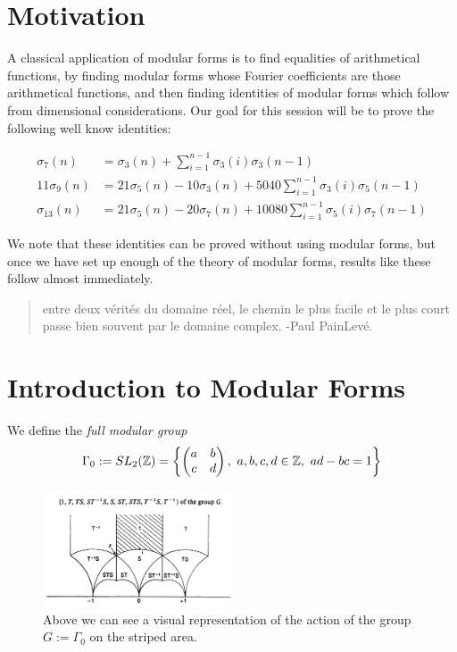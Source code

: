 \section*{Motivation}
A classical application of modular forms is to find equalities of arithmetical functions,
by finding modular forms whose Fourier coefficients are those arithmetical functions, and then
finding identities of modular forms which follow from dimensional considerations. Our goal for
this session will be to prove the following well know identities:

\begin{align*}
    \sigma_7(n) &= \sigma_3(n)+\sum_{i=1}^{n-1}\sigma_3(i)\sigma_3(n-1) \\
    11\sigma_9(n) &= 21\sigma_5(n)-10\sigma_3(n)+5040\sum_{i=1}^{n-1}\sigma_3(i)\sigma_5(n-1) \\
    \sigma_{13}(n) &= 21\sigma_5(n)-20\sigma_7(n)+10080\sum_{i=1}^{n-1}\sigma_5(i)\sigma_7(n-1)     
\end{align*}

We note that these identities can be proved without using modular forms, but once we  have 
set up enough of the theory of modular forms, results like these follow almost immediately. 

\begin{quotation}
    entre deux vérités du domaine réel, le chemin le plus facile et le plus court passe bien souvent par le domaine complex. 
    \mb 
    -Paul PainLevé.
\end{quotation}

\section{Introduction to Modular Forms}
We define the \textit{full modular group}
\[\Gamma_0 := SL_2(\mathbb Z) = \left\{\begin{pmatrix} a & b \\ c & d \end{pmatrix},\,\, a,b,c,d \in \mathbb Z, \,\, ad-bc = 1\right\}\]
\begin{figure}[h]
    \centering
    \includegraphics[width=0.5\textwidth]{FD.png}
    \caption{Above we can see a visual representation of the action of the group $G := \Gamma_0$ 
    on the striped area.}
\end{figure}



